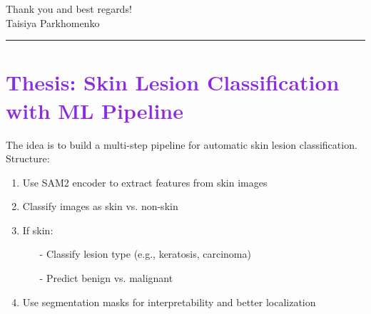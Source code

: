 \documentclass[11pt,a4paper]{article}
\begin{document}
\vspace{0.5cm}
\raggedright
Thank you and best regards!\\
Taisiya Parkhomenko

\vspace{2cm}
\hrule
\section*{\textcolor{BlueViolet}{Thesis: Skin Lesion Classification with ML Pipeline}}
\vspace{0.7cm}
The idea is to build a multi-step pipeline for automatic skin lesion classification.\\
Structure:

\begin{enumerate}[leftmargin=*]
    \item Use SAM2 encoder to extract features from skin images
    \item Classify images as skin vs. non-skin
    \item If skin:
    \begin{itemize}
        \item[-] Classify lesion type (e.g., keratosis, carcinoma)
        \item[-] Predict benign vs. malignant
    \end{itemize}
    \item Use segmentation masks for interpretability and better localization
\end{enumerate}


\hypertarget{commitment}{}

\hypertarget{transcript}{}

\end{document}
